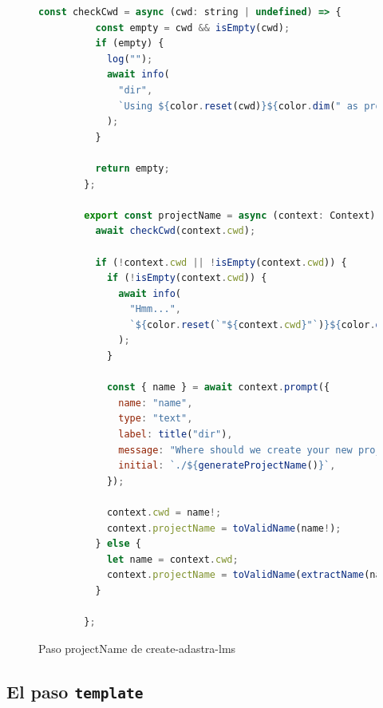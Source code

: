 \begin{figure}
    \begin{lstlisting}[language=Javascript]
        const checkCwd = async (cwd: string | undefined) => {
          const empty = cwd && isEmpty(cwd);
          if (empty) {
            log("");
            await info(
              "dir",
              `Using ${color.reset(cwd)}${color.dim(" as project directory")}`
            );
          }
        
          return empty;
        };
        
        export const projectName = async (context: Context) => {
          await checkCwd(context.cwd);
        
          if (!context.cwd || !isEmpty(context.cwd)) {
            if (!isEmpty(context.cwd)) {
              await info(
                "Hmm...",
                `${color.reset(`"${context.cwd}"`)}${color.dim(` is not empty!`)}`
              );
            }
        
            const { name } = await context.prompt({
              name: "name",
              type: "text",
              label: title("dir"),
              message: "Where should we create your new project?",
              initial: `./${generateProjectName()}`,
            });
        
            context.cwd = name!;
            context.projectName = toValidName(name!);
          } else {
            let name = context.cwd;
            context.projectName = toValidName(extractName(name));
          }
        
        };
    \end{lstlisting}
    \caption{Paso projectName de create-adastra-lms}
    \label{fig:adastraCreateProjectName}
\end{figure}

\subsection{El paso {\tt template}}

